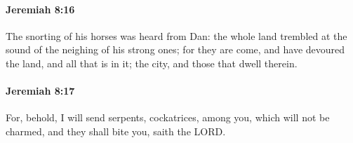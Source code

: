 		\paragraph{Jeremiah 8:16} %
			\label{JEREMIAH-8-16}

			The snorting of his horses was heard from Dan: the whole land trembled at the sound of the neighing of his strong ones; for they are come, and have devoured the land, and all that is in it; the city, and those that dwell therein.


		\paragraph{Jeremiah 8:17} %
			\label{JEREMIAH-8-17}

			For, behold, I will send serpents, cockatrices, among you, which will not be charmed, and they shall bite you, saith the LORD.


